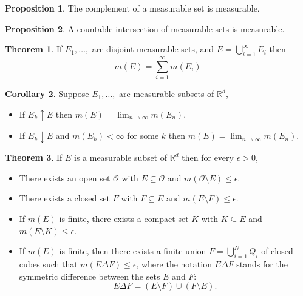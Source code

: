 \documentclass{article}
\theoremstyle{definition}
\newtheorem{prop}{Proposition}[section]
\newcommand{\R}{\mathbb{R}}
\theoremstyle{theorem}
\newtheorem{theorem}{Theorem}[section]
\newtheorem{corollary}[theorem]{Corollary}
\begin{document}
\begin{prop}
The complement of a measurable set is measurable.
\end{prop}

\begin{prop}
A countable intersection of measurable sets is measurable.
\end{prop}


\begin{theorem}
If $E_1,\dots,$ are disjoint measurable sets, and $E = \bigcup^\infty_{i=1}E_i$ then 
\begin{equation*}
    m(E) = \sum^\infty_{i=1}m(E_i)
\end{equation*}
\end{theorem}

\begin{corollary}
Suppose $E_1,\dots,$ are measurable subsets of $\mathbb{R}^d$, 
\begin{itemize}
    \item If $E_k \uparrow E$ then $m(E) = \lim_{n\to \infty}m(E_n)$.
    \item If $E_k \downarrow E$ and $m(E_k) < \infty$ for some $k$ then $m(E) = \lim_{n\to \infty} m(E_n)$.
\end{itemize}
\end{corollary}




\begin{theorem}
If  $E$ is a measurable subset of $\R^d$ then for every $\epsilon > 0$, 
\begin{itemize}
    \item There exists an open set $\mathcal{O}$ with $E \subseteq \mathcal{O}$ and $m(\mathcal{O}\setminus E) \leq \epsilon$.
    
    \item There exists a closed set $F$ with $F \subseteq E$ and $m(E\setminus F) \leq \epsilon$.
    
    \item If $m(E)$ is finite, there exists a compact set $K$ with $K \subseteq E$ and $m(E\setminus K) \leq \epsilon$.
    
    \item If $m(E)$ is finite, then there exists a finite union $F = \bigcup^N_{i=1}Q_i$ of closed cubes such that $m(E\Delta F) \leq \epsilon$, where the notation $E\Delta F$ stands for the symmetric difference between the sets $E$ and $F$:
    \begin{equation*}
        E \Delta F = (E\setminus F) \cup (F \setminus E).
    \end{equation*}
\end{itemize}
\end{theorem}
\end{document}
